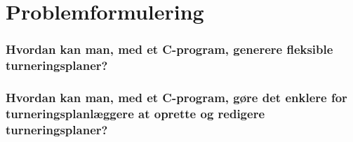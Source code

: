 \chapter{Problemformulering}\label{ch:chlabel}
\subsection*{Hvordan kan man, med et C-program, generere fleksible turneringsplaner?}
\subsection*{Hvordan kan man, med et C-program, gøre det enklere for turneringsplanlæggere at oprette og redigere turneringsplaner?}

